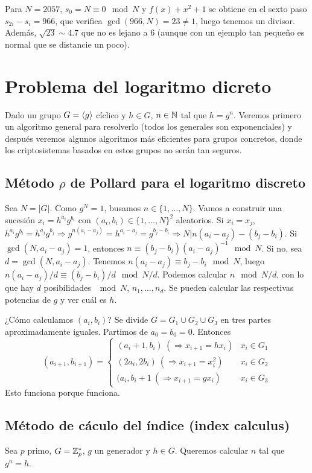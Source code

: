 \documentclass[CR.tex]{subfiles}
\begin{document}
Para $N=2057$, $s_0=N\equiv 0\mod N$ y $f(x)+x^2+1$ se obtiene en el sexto paso $s_{2i}-s_i=966$, que verifica $\gcd(966,N)=23\neq 1$, luego tenemos un divisor. Además, $\sqrt{23}\sim 4.7$ que no es lejano a 6 (aunque con un ejemplo tan pequeño es normal que se distancie un poco). 

\section{Problema del logaritmo dicreto}
Dado un grupo $G=\langle{g}\rangle$ cíclico y $h\in G$, $n\in\mathbb{N}$ tal que $h=g^n$. Veremos primero un algoritmo general para resolverlo (todos los generales son exponenciales) y después veremos algunos algoritmos más eficientes para grupos concretos, donde los criptosistemas basados en estos grupos no serán tan seguros.

\subsection{Método $\rho$ de Pollard para el logaritmo discreto}
Sea $N=|G|$. Como $g^N=1$, busamos $n\in\{1,\dots, N\}$. Vamos a construir una sucesión $x_i=h^{a_i}g^{b_i}$ con $(a_i,b_i)\in\{1,\dots, N\}^2$ aleatorios. Si $x_i=x_j$, $h^{a_i}g^{b_i}=h^{a_j}g^{b_j}\Rightarrow g^{n(a_i-a_j)}=h^{a_i-a_j}=g^{b_j-b_i}\Rightarrow N|n(a_i-a_j)-(b_j-b_i)$. Si $\gcd(N,a_i-a_j)=1$, entonces $n\equiv (b_j-b_i)(a_i-a_j)^{-1}\mod N$. Si no, sea $d=\gcd(N,a_i-a_j)$. Tenemos $n(a_i-a_j)\equiv b_j-b_i\mod N$, luego $n(a_i-a_j)/d\equiv (b_j-b_i)/d\mod N/d$. Podemos calcular $n\mod N/d$, con lo que hay $d$ posibilidades $\mod N$, $n_1,\dots, n_d$. Se pueden calcular las respectivas potencias de $g$ y ver cuál es $h$. 

¿Cómo calculamos $(a_i,b_i)$? Se divide $G=G_1\cup G_2\cup G_3$ en tres partes aproximadamente iguales. Partimos de $a_0=b_0=0$. Entonces 
\[
(a_{i+1},b_{i+1})=\begin{cases}
(a_i+1,b_i)\ (\Rightarrow x_{i+1}=hx_i) & x_i\in G_1\\
(2a_i,2b_i)\ (\Rightarrow x_{i+1}=x_i^2) & x_i\in G_2\\
(a_i,b_i+1\ (\Rightarrow x_{i+1}=gx_i) & x_i\in G_3
\end{cases}
\]
Esto funciona porque funciona.

\subsection{Método de cáculo del índice (index calculus)}
Sea $p$ primo, $G=\mathbb{Z}_p^*$, $g$ un generador y $h\in G$. Queremos calcular $n$ tal que $g^n=h$. 
\end{document}
